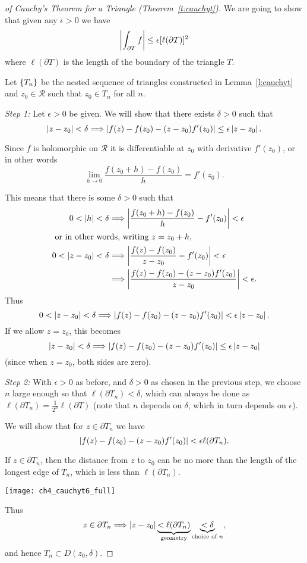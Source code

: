 \begin{proof}[of Cauchy's Theorem for a Triangle (Theorem~\ref{t:cauchyt})]
We are going to show that given any $\epsilon>0$ we have
\[
\left|  \int_{\partial T} f  \right| \leq \epsilon [\ell (\partial T)]^2
\]
where $\ell ( \partial T )$ is the length of the boundary of the triangle $T$.

Let $\left\{ T_n\right\}$ be the nested sequence of triangles constructed in Lemma~\ref{l:cauchyt} and $z_0 \in \mathcal{R}$ such that $z_0 \in T_n$ for all $n$.

\emph{Step 1:}    Let $\epsilon>0$ be given.  We will show that there exists $\delta>0$ such that 
\[
\left| z-z_0 \right|<\delta \Longrightarrow \left| f(z)-f(z_0)-(z-z_0)f'(z_0) \right| \leq \epsilon \left| z-z_0 \right|.
\]


  Since $f$ is holomorphic on $\mathcal{R}$ it is differentiable at $z_0$ with derivative $f'(z_0)$, or in other words
  \[
  \lim_{h \to 0} \frac{f(z_0+h)-f(z_0)}{h} = f'(z_0).
  \]  

  This means that there is some $\delta>0$ such that
  \begin{align*}
  0 < \left| h \right| < \delta &\Longrightarrow \left|  \frac{f(z_0+h)-f(z_0)}{h} - f'(z_0)  \right| < \epsilon \\
  \shortintertext{ or in other words, writing $z=z_0+h$,}
  0 < \left| z-z_0 \right| < \delta &\Longrightarrow \left|  \frac{f(z)-f(z_0)}{z-z_0} - f'(z_0)  \right| < \epsilon \\
  & \Longrightarrow \left|  \frac{f(z)-f(z_0)-(z-z_0)f'(z_0)}{z-z_0}  \right| < \epsilon.
  \end{align*}
Thus
\[
0 < \left| z-z_0 \right| < \delta \Longrightarrow \left| f(z)-f(z_0)-(z-z_0)f'(z_0) \right| < \epsilon \left| z-z_0 \right|.
\]
If we allow $z=z_0$, this becomes
\[
\left| z-z_0 \right| < \delta \Longrightarrow \left| f(z)-f(z_0)-(z-z_0)f'(z_0) \right| \leq \epsilon \left| z-z_0 \right|
\]
(since when $z=z_0$, both sides are zero).

\emph{Step 2: } With $\epsilon>0$ as before, and $\delta>0$ as chosen in the previous step, we choose $n$ large enough so that $\ell ( \partial T_n ) < \delta$, which can always be done as $\ell ( \partial T_n ) = \frac{1}{2^n} \ell ( \partial T)$ (note that $n$ depends on $\delta$, which in turn depends on $\epsilon$).

We will show that for $z \in \partial T_n$ we have
\[
\left| f(z)-f(z_0)-(z-z_0)f'(z_0) \right|<\epsilon \ell ( \partial T_n).
\]



If $z \in \partial T_n$, then the distance from $z$ to $z_0$ can be no more than the length of the longest edge of $T_n$, which is less than $\ell ( \partial T_n)$.
\begin{center}
\texttt{[image: ch4\_cauchyt6\_full]}
\end{center}
Thus
\[
z \in \partial T_n \Longrightarrow \left| z-z_0 \right| \underbrace{< \ell (\partial T_n) }_{\text{geometry}} \underbrace{< \delta}_{\text{choice of }n},
\]
and hence $T_n \subset D(z_0,\delta)$.


\end{proof}
